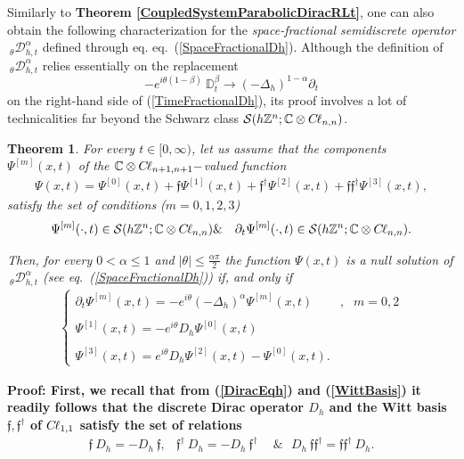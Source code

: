 \documentclass{elsarticle}
\newcommand{\BC}{{\mathbb C}}
\newcommand{\BZ}{{\mathbb Z}}
\newcommand{\RL}{{\mathbb D}_t}
\newcommand{\f}{{\mathfrak f}}
\newcommand{\cl}{C \kern -0.1em \ell}
\newcommand{\proof}{\bf {Proof:} \rm}
\newtheorem{theorem}{Theorem}[section]
\begin{document}
Similarly to {\bf Theorem \ref{CoupledSystemParabolicDiracRLt}}, one can also obtain the following characterization for the {\it space-fractional semidiscrete operator} 
${~}_\theta\mathcal{D}_{h,t}^\alpha$ defined through eq. eq.~(\ref{SpaceFractionalDh}). Although the definition of ${~}_\theta\mathcal{D}_{h,t}^\alpha$ relies essentially on the replacement $$-e^{i \theta(1-\beta)}~\RL^\beta\longrightarrow (-\Delta_h)^{1-\alpha}\partial_t$$
on the right-hand side of (\ref{TimeFractionalDh}), its proof involves a lot of technicalities far beyond the Schwarz class $\mathcal{S}(h\BZ^n;\BC \otimes \cl_{n,n})$.
\begin{theorem}\label{CoupledSystemParabolicDiract}
	For every $t\in [0,\infty)$, let us assume that the components $\Psi^{[m]}(x,t)$ of the
	$\BC\otimes\cl_{n+1,n+1}-$valued function \begin{eqnarray*}
		\Psi(x,t)=\Psi^{[0]}(x,t)+\f\Psi^{[1]}(x,t)+\f^\dagger\Psi^{[2]}(x,t)+\f\f^\dagger\Psi^{[3]}(x,t),
	\end{eqnarray*}
	satisfy	the set of conditions ($m=0,1,2,3$)
	\begin{eqnarray*}
		\Psi^{[m]}(\cdot,t)\in \mathcal{S}(h\BZ^n;\BC \otimes \cl_{n,n}) &\&& \partial_t\Psi^{[m]}(\cdot,t)\in \mathcal{S}(h\BZ^n;\BC \otimes \cl_{n,n}). 
	\end{eqnarray*}
	
	
	
	Then, for every $0<\alpha\leq 1$ and $|\theta|\leq\frac{\alpha\pi}{2}$ the function $\Psi(x,t)$ is a null solution of ${~}_\theta\mathcal{D}_{h,t}^{\alpha}$ (see eq.~(\ref{SpaceFractionalDh})) if, and only if
	\begin{eqnarray}
		\label{CoupledSystemsHeatAlpha} \left\{\begin{array}{lll} 
			\partial_t\Psi^{[m]}(x,t)=-e^{i\theta}(-\Delta_h)^\alpha\Psi^{[m]}(x,t) & , & m=0,2
			\\ \ \\
			\Psi^{[1]}(x,t)=-e^{i\theta}D_h
			\Psi^{[0]}(x,t) & &\\ \ \\
			\Psi^{[3]}(x,t)=e^{i\theta}D_h\Psi^{[2]}(x,t)-\Psi^{[0]}(x,t). &  & 
		\end{array}\right.
	\end{eqnarray}
\end{theorem}

\proof
First, we recall that from (\ref{DiracEqh}) and (\ref{WittBasis}) it readily follows that the discrete Dirac operator $D_h$ and the Witt basis $\f,\f^\dagger$ of $\cl_{1,1}$ satisfy the set of relations
\begin{eqnarray*}
	\f ~D_h=-D_h~\f, & \f^\dagger ~D_h=-D_h~\f^\dagger &~~\mbox{\&}~~ ~D_h~\f\f^\dagger=\f\f^\dagger~ D_h.
\end{eqnarray*}
\end{document}
